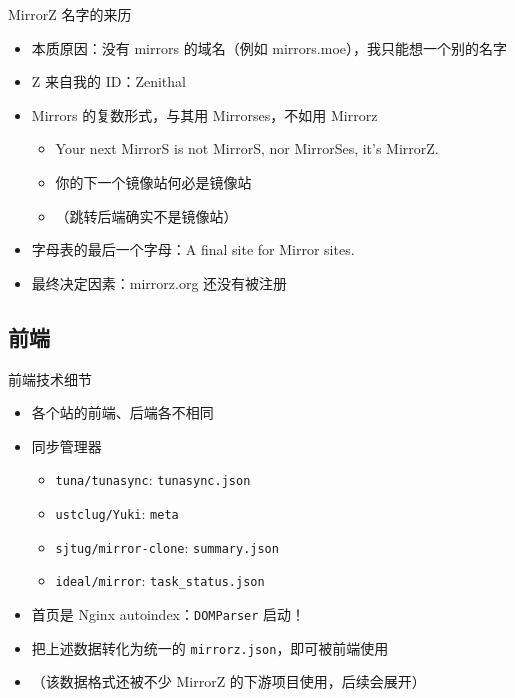 \documentclass{ctexbeamer}
\newcommand{\T}[1]{\texttt{#1}}
\begin{document}
\begin{frame}{MirrorZ 名字的来历}
  \begin{itemize}
    \item 本质原因：没有 mirrors 的域名（例如 mirrors.moe），我只能想一个别的名字
    \item Z 来自我的 ID：Zenithal
    \item Mirrors 的复数形式，与其用 Mirrorses，不如用 Mirrorz\begin{itemize}
      \item Your next MirrorS is not MirrorS, nor MirrorSes, it's MirrorZ.
      \item 你的下一个镜像站何必是镜像站
      \item （跳转后端确实不是镜像站）
    \end{itemize}
    \item 字母表的最后一个字母：A final site for Mirror sites.
    \item 最终决定因素：mirrorz.org 还没有被注册
  \end{itemize}
\end{frame}

\subsection{前端}
\begin{frame}{前端技术细节}
  \begin{itemize}
    \item 各个站的前端、后端各不相同
    \item 同步管理器\begin{itemize}
      \item \T{tuna/tunasync}: \T{tunasync.json}
      \item \T{ustclug/Yuki}: \T{meta}
      \item \T{sjtug/mirror-clone}: \T{summary.json}
      \item \T{ideal/mirror}: \T{task\_status.json}
    \end{itemize}
    \item 首页是 Nginx autoindex：\T{DOMParser} 启动！
    \item 把上述数据转化为统一的 \T{mirrorz.json}，即可被前端使用
    \item （该数据格式还被不少 MirrorZ 的下游项目使用，后续会展开）
  \end{itemize}
\end{frame}
\end{document}
